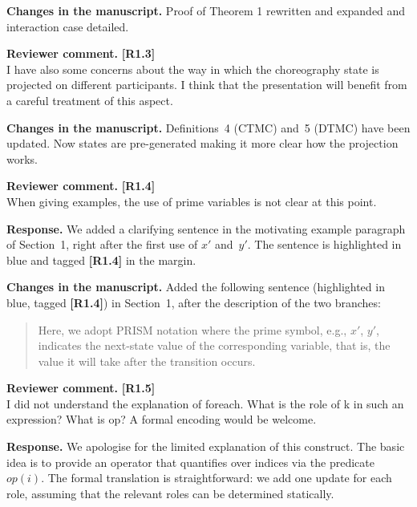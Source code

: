 \documentclass[11pt]{article}
\newcommand{\revcomment}[1]{%
  \begin{reviewercomment}
  \textbf{Reviewer comment.} #1
  \end{reviewercomment}
}
\newcommand{\revresponse}[2][]{%
  \par\noindent\textbf{Response.} #1 #2
}
\newcommand{\revchanges}[2][]{%
  \par\noindent\textbf{Changes in the manuscript.} #1
  #2\par\bigskip
}
\begin{document}
\revchanges{ Proof of Theorem 1 rewritten and expanded and interaction
  case detailed.}



\revcomment{\textbf{[R1.3]}\\
I have also some concerns about the way in which the choreography
state is projected on different participants. I think that the
presentation will benefit from a careful treatment of this aspect.
}

\revchanges{ Definitions~4 (CTMC) and~5 (DTMC) have been updated. Now
  states are pre-generated making it more clear how the projection
  works. }


\revcomment{\textbf{[R1.4]}\\
When giving examples, the use of prime variables is not clear at
this point.
}

\revresponse{ We added a clarifying sentence in the motivating
  example paragraph of Section~1, right after the first use of
  $x'$ and~$y'$. The sentence is highlighted in blue and tagged
  \textbf{[R1.4]} in the margin.}

\revchanges{ Added the following sentence (highlighted in blue,
  tagged \textbf{[R1.4]}) in Section~1, after the description of
  the two branches:
  \begin{quote}\small
    Here, we adopt PRISM notation where the prime symbol, e.g.,
    $x'$, $y'$, indicates the next-state value of the corresponding
    variable, that is, the value it will take after the transition
    occurs.
  \end{quote}
}





\revcomment{\textbf{[R1.5]}\\
I did not understand the explanation of foreach. What is the role of
k in such an expression? What is op? A formal encoding would be
welcome.
}

\revresponse{
  We apologise for the limited explanation of this construct. The basic idea is to provide an operator that quantifies over indices via the predicate $\textit{op}(i)$. The formal translation is straightforward: we add one update for each role, assuming that the relevant roles can be determined statically.
}
\end{document}
